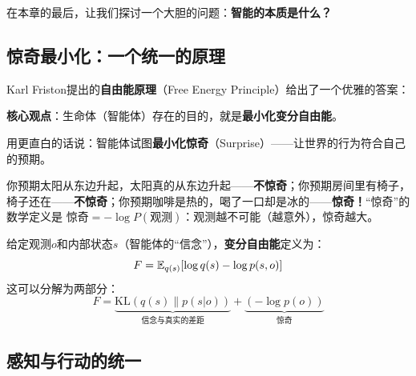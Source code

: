 
在本章的最后，让我们探讨一个大胆的问题：\textbf{智能的本质是什么？}

\subsection*{惊奇最小化：一个统一的原理}

Karl Friston提出的\textbf{自由能原理}（Free Energy Principle）给出了一个优雅的答案：

\begin{philosophy}
\textbf{核心观点}：生命体（智能体）存在的目的，就是\textbf{最小化变分自由能}。

用更直白的话说：智能体试图\textbf{最小化惊奇}（Surprise）——让世界的行为符合自己的预期。
\end{philosophy}

\begin{example}[什么是“惊奇”？]
你预期太阳从东边升起，太阳真的从东边升起——\textbf{不惊奇}；你预期房间里有椅子，椅子还在——\textbf{不惊奇}；你预期咖啡是热的，喝了一口却是冰的——\textbf{惊奇！}“惊奇”的数学定义是 $\text{惊奇} = -\log P(\text{观测})$：观测越不可能（越意外），惊奇越大。
\end{example}

\begin{definition}
给定观测$o$和内部状态$s$（智能体的“信念”），\textbf{变分自由能}定义为：
\begin{equation}
    F = \mathbb{E}_{q(s)}[\log q(s) - \log p(s, o)]
\end{equation}
这可以分解为两部分：
\begin{equation}
    F = \underbrace{\text{KL}(q(s) \| p(s|o))}_{\text{信念与真实的差距}} + \underbrace{(-\log p(o))}_{\text{惊奇}}
\end{equation}
\end{definition}

\subsection*{感知与行动的统一}

